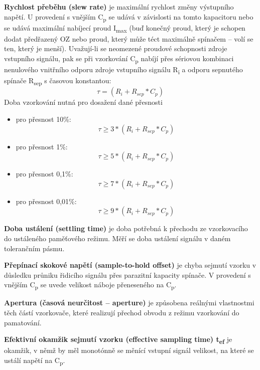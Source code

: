 \textbf{Rychlost přeběhu (slew rate)} je maximální rychlost změny výstupního napětí. U provedení s vnějším C\textsubscript{p} se udává v závislosti na tomto kapacitoru nebo se udává maximální nabíjecí proud I\textsubscript{max} (buď konečný proud, který je schopen dodat předřazený OZ nebo proud, který může téct maximálně spínačem – volí se ten, který je menší). Uvažují-li se neomezené proudové schopnosti zdroje vstupního signálu, pak se při vzorkování C\textsubscript{p} nabíjí přes sériovou kombinaci nenulového vnitřního odporu zdroje vstupního signálu R\textsubscript{i} a odporu sepnutého spínače R\textsubscript{sep} s časovou konstantou:
\begin{equation}
\tau = (R_{i}+R_{sep}*C_{p})
\end{equation}
\newpage
Doba vzorkování nutná pro dosažení dané přesnosti
\begin{itemize}
\item pro přesnost 10\%: 
\begin{equation}
\tau \geq 3*(R_{i}+R_{sep}*C_{p})
\end{equation}
\item pro přesnost 1\%: 
\begin{equation}
\tau \geq 5*(R_{i}+R_{sep}*C_{p})
\end{equation}
\item pro přesnost 0,1\%: 
\begin{equation}
\tau \geq 7*(R_{i}+R_{sep}*C_{p})
\end{equation}
\item pro přesnost 0,01\%: 
\begin{equation}
\tau \geq 9*(R_{i}+R_{sep}*C_{p})
\end{equation}
\end{itemize}

\textbf{Doba ustálení (settling time)} je doba potřebná k přechodu ze vzorkovacího do ustáleného paměťového režimu. Měří se doba ustálení signálu v daném tolerančním pásmu.

\textbf{Přepínací skokové napětí (sample-to-hold offset)} je chyba sejmutí vzorku v důsledku
průniku řidicího signálu přes parazitní kapacity spínače. V provedení s vnějším C\textsubscript{p} se uvede
velikost náboje přeneseného na C\textsubscript{p}.

\textbf{Apertura (časová neurčitost – aperture)} je způsobena reálnými vlastnostmi těch částí
vzorkovače, které realizují přechod obvodu z režimu vzorkování do pamatování.

\textbf{Efektivní okamžik sejmutí vzorku (effective sampling time) t\textsubscript{ef}} je okamžik, v němž by
měl monotónně se měnící vstupní signál velikost, na které se ustálí napětí na C\textsubscript{p}.

